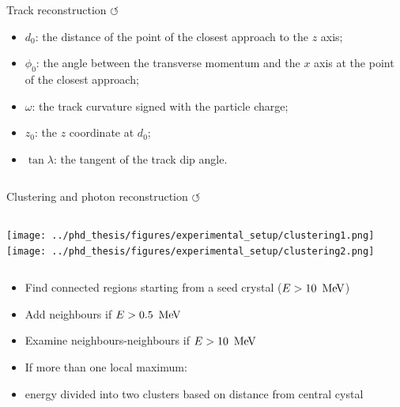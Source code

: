 \documentclass[xcolor=dvipsnames]{beamer}
\begin{document}
\begin{frame}{Track reconstruction \hyperlink{frame:A}{$\circlearrowleft$}}
\scriptsize\centering
         \begin{itemize}
            \item $d_0$: the distance of the point of the closest approach to the $z$ axis;
            \item $\phi_0$: the angle between the transverse momentum and the $x$ axis at the point of the closest approach;
            \item $\omega$: the track curvature signed with the particle charge;
            \item $z_0$: the $z$ coordinate at $d_0$;
            \item $\tan\lambda$: the tangent of the track dip angle.
        \end{itemize}

\begin{columns}
\end{columns}




\end{frame}

\begin{frame}{Clustering and photon reconstruction \hyperlink{frame:A}{$\circlearrowleft$}}
   \scriptsize\centering
   \begin{columns}
   \centering
      \texttt{[image: ../phd\_thesis/figures/experimental\_setup/clustering1.png]}
   \centering
          \texttt{[image: ../phd\_thesis/figures/experimental\_setup/clustering2.png]}
   \end{columns}

   \begin{itemize}
      \item Find connected regions starting from a seed crystal ($E>10~\mathrm{\,Me\kern -0.1em V}$)
      \item Add neighbours if $E>0.5~\mathrm{\,Me\kern -0.1em V}$
      \item Examine neighbours-neighbours if $E>10~\mathrm{\,Me\kern -0.1em V}$
      \item If more than one local maximum: 
      \item[] energy divided into two clusters based on distance from central cystal
   \end{itemize}

\end{frame}
\end{document}
